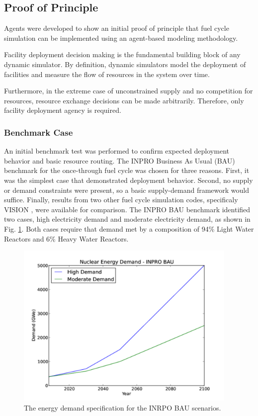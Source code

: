 \subsection{Proof of Principle}\label{abm:abm:proof}

Agents were developed to show an initial proof of principle that fuel cycle
simulation can be implemented using an agent-based modeling methodology.

Facility deployment decision making is the fundamental building block of any
dynamic simulator. By definition, dynamic simulators model the deployment of
facilities and measure the flow of resources in the system over time. 

Furthermore, in the extreme case of unconstrained supply and no competition for
resources, resource exchange decisions can be made arbitrarily. Therefore, only
facility deployment agency is required.

\subsubsection{Benchmark Case}

An initial benchmark test was performed to confirm expected deployment behavior
and basic resource routing. The INPRO Business As Usual (BAU) benchmark for the
once-through fuel cycle was chosen for three reasons. First, it was the simplest
case that demonstrated deployment behavior. Second, no supply or demand
constraints were present, so a basic supply-demand framework would
suffice. Finally, results from two other fuel cycle simulation codes,
specificaly VISION \cite{}, were available for comparison. The INPRO BAU
benchmark identified two cases, high electricity demand and moderate electricity
demand, as shown in Fig. \ref{fig:inpro-demand}. Both cases require that demand
met by a composition of 94\% Light Water Reactors and 6\% Heavy Water Reactors.

\begin{figure}
  \begin{center}
    \includegraphics[height=8cm]{./figs/inpro-demand.pdf}
    \caption{The energy demand specification for the INRPO BAU scenarios.}
    \label{fig:inpro-demand}
  \end{center}  
\end{figure}

